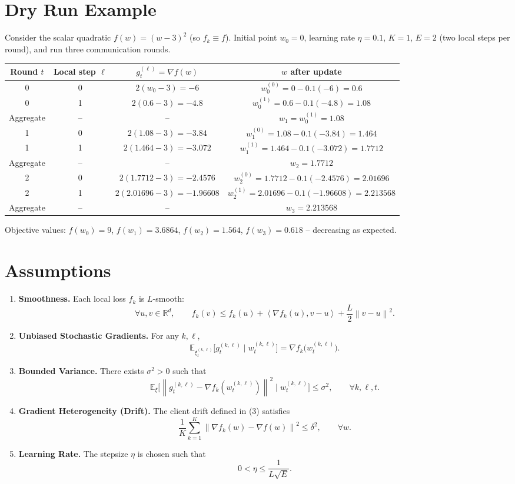 \documentclass{article}
\newcommand{\E}{\mathbb{E}}
\newcommand{\norm}[1]{\left\lVert #1\right\rVert}
\newcommand{\ip}[2]{\left\langle #1,#2\right\rangle}
\begin{document}
\section*{Dry Run Example}
Consider the scalar quadratic $f(w)=(w-3)^2$ (so $f_k\equiv f$).  
Initial point $w_0=0$, learning rate $\eta=0.1$, $K=1$, $E=2$ (two local steps per round), and run three communication rounds.

\begin{center}
\begin{tabular}{c|c|c|c}
Round $t$ & Local step $\ell$ & $g_{t}^{(\ell)}=\nabla f(w)$ & $w$ after update \\ \hline
0 & 0 & $2(w_0-3) = -6$ & $w_{0}^{(0)} = 0 -0.1(-6)=0.6$ \\
0 & 1 & $2(0.6-3)=-4.8$ & $w_{0}^{(1)} =0.6-0.1(-4.8)=1.08$ \\ \hline
Aggregate & – & – & $w_1 = w_{0}^{(1)} = 1.08$ \\ \hline
1 & 0 & $2(1.08-3)=-3.84$ & $w_{1}^{(0)} =1.08-0.1(-3.84)=1.464$ \\
1 & 1 & $2(1.464-3)=-3.072$ & $w_{1}^{(1)} =1.464-0.1(-3.072)=1.7712$ \\ \hline
Aggregate & – & – & $w_2 = 1.7712$ \\ \hline
2 & 0 & $2(1.7712-3)=-2.4576$ & $w_{2}^{(0)} =1.7712-0.1(-2.4576)=2.01696$ \\
2 & 1 & $2(2.01696-3)=-1.96608$ & $w_{2}^{(1)} =2.01696-0.1(-1.96608)=2.213568$ \\ \hline
Aggregate & – & – & $w_3 = 2.213568$
\end{tabular}
\end{center}
Objective values: $f(w_0)=9$, $f(w_1)=3.6864$, $f(w_2)=1.564$, $f(w_3)=0.618$ – decreasing as expected.

\section*{Assumptions}
\begin{enumerate}[label=\arabic*.]
\item \textbf{Smoothness.} Each local loss $f_k$ is $L$‑smooth:
\[
\forall u,v\in\mathbb{R}^d,\qquad
f_k(v)\le f_k(u)+\ip{\nabla f_k(u)}{v-u}+\frac{L}{2}\norm{v-u}^2 .
\tag{A1}
\]
\item \textbf{Unbiased Stochastic Gradients.} For any $k,\ell$,
\[
\E_{\xi_{t}^{(k,\ell)}}\!\bigl[g_{t}^{(k,\ell)}\mid w_{t}^{(k,\ell)}\bigr]
= \nabla f_k\!\bigl(w_{t}^{(k,\ell)}\bigr).
\tag{A2}
\]
\item \textbf{Bounded Variance.} There exists $\sigma^2>0$ such that
\[
\E_{\xi}\!\bigl[\norm{g_{t}^{(k,\ell)}-\nabla f_k(w_{t}^{(k,\ell)})}^2\mid w_{t}^{(k,\ell)}\bigr]
\le \sigma^2,\qquad\forall k,\ell,t.
\tag{A3}
\]
\item \textbf{Gradient Heterogeneity (Drift).} The client drift defined in (3) satisfies
\[
\frac1K\sum_{k=1}^{K}\norm{\nabla f_k(w)-\nabla f(w)}^2 \le \delta^2,\qquad\forall w.
\tag{A4}
\]
\item \textbf{Learning Rate.} The stepsize $\eta$ is chosen such that
\[
0<\eta \le \frac{1}{L\sqrt{E}} .
\tag{A5}
\]
\end{enumerate}
\end{document}
